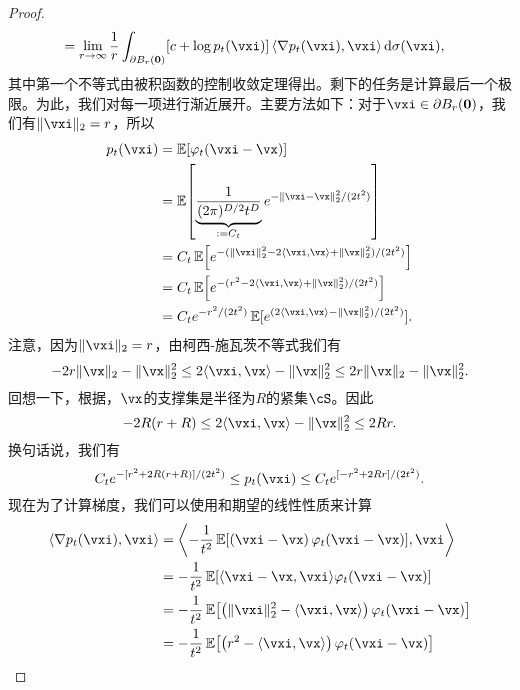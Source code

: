 \documentclass[../../book-main.tex]{subfiles}
\begin{document}
\begin{proof}
\begin{align}
        &= \lim_{r \to \infty}\frac{1}{r}\int_{\partial B_{r}(\vzero)}[c + \log p_{t}(\vxi)]\ip*{\nabla p_{t}(\vxi)}{\vxi}\odif{\sigma(\vxi)},
    \end{align}
    其中第一个不等式由被积函数的控制收敛定理得出。剩下的任务是计算最后一个极限。为此，我们对每一项进行渐近展开。主要方法如下：对于\(\vxi \in \partial B_{r}(\vzero)\)，我们有\(\norm{\vxi}_{2} = r\)，所以
    \begin{align}
        p_{t}(\vxi)
        &= \Ex[\phi_{t}(\vxi - \vx)] \\ 
        &= \Ex\rs{\underbrace{\frac{1}{(2\pi)^{D/2}t^{D}}}_{:= C_{t}}e^{-\|\vxi - \vx\|_{2}^{2}/(2t^{2})}} \\
        &= C_{t}\Ex\rs{e^{-(\norm{\vxi}_{2}^{2} - 2\ip{\vxi}{\vx} + \norm{\vx}_{2}^{2})/(2t^{2})}} \\ 
        &= C_{t}\Ex\rs{e^{-(r^{2} - 2\ip{\vxi}{\vx} + \norm{\vx}_{2}^{2})/(2t^{2})}} \\ 
        &= C_{t}e^{-r^{2}/(2t^{2})}\Ex[e^{(2\ip{\vxi}{\vx} - \norm{\vx}_{2}^{2})/(2t^{2})}]. 
    \end{align}
    注意，因为\(\norm{\vxi}_{2} = r\)，由柯西-施瓦茨不等式我们有
    \begin{equation}
        -2r\norm{\vx}_{2} - \norm{\vx}_{2}^{2} \leq 2\ip{\vxi}{\vx} - \norm{\vx}_{2}^{2} \leq 2r\norm{\vx}_{2} - \norm{\vx}_{2}^{2}.
    \end{equation}
    回想一下，根据，\(\vx\)的支撑集是半径为\(R\)的紧集\(\cS\)。因此
    \begin{equation}
        -2R(r + R) \leq 2\ip{\vxi}{\vx} - \norm{\vx}_{2}^{2} \leq 2Rr.
    \end{equation}
    换句话说，我们有
    \begin{equation}
        C_{t}e^{-[r^{2} + 2R(r + R)]/(2t^{2})} \leq p_{t}(\vxi) \leq C_{t}e^{[-r^{2} + 2Rr]/(2t^{2})}.
    \end{equation}
    现在为了计算梯度，我们可以使用和期望的线性性质来计算
    \begin{align}
        \ip{\nabla p_{t}(\vxi)}{\vxi}
        &= \ip*{-\frac{1}{t^{2}}\Ex\rs{\bp{\vxi - \vx}\phi_{t}(\vxi - \vx)}}{\vxi} \\
        &= -\frac{1}{t^{2}}\Ex\rs{\ip{\vxi - \vx}{\vxi}\phi_{t}(\vxi - \vx)} \\
        &= -\frac{1}{t^{2}}\Ex\rs{\bp{\norm{\vxi}_{2}^{2} - \ip{\vxi}{\vx}}\phi_{t}(\vxi - \vx)} \\
        &= -\frac{1}{t^{2}}\Ex\rs{\bp{r^{2} - \ip{\vxi}{\vx}}\phi_{t}(\vxi - \vx)} \\

\end{align}
\end{proof}
\end{document}
